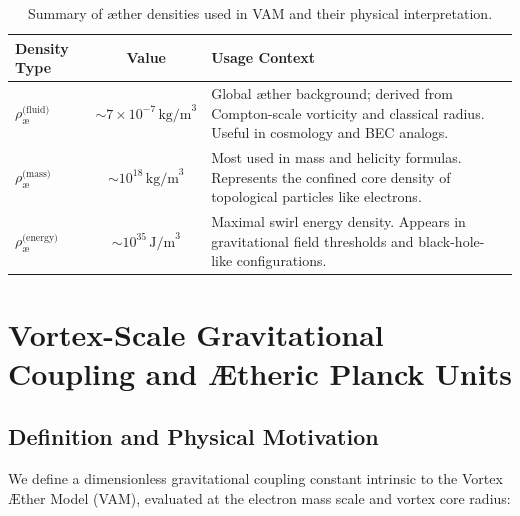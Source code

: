 \documentclass[preprint]{revtex4-2}
\begin{document}
                \vspace{0.3cm}
                \begin{table}[H]
                    \centering
                    \scriptsize
                    \begin{tabular}{|l|c|p{7.5cm}|}
                        \hline
                        \textbf{Density Type} & \textbf{Value} & \textbf{Usage Context} \\
                        \hline
                        \( \rho_{\text{\ae}}^{\text{(fluid)}} \) & \( \sim 7 \times 10^{-7} \, \text{kg/m}^3 \) & Global æther background; derived from Compton-scale vorticity and classical radius. Useful in cosmology and BEC analogs. \\
                        \hline
                        \( \rho_{\text{\ae}}^{\text{(mass)}} \) & \( \sim 10^{18} \, \text{kg/m}^3 \) & Most used in mass and helicity formulas. Represents the confined core density of topological particles like electrons. \\
                        \hline
                        \( \rho_{\text{\ae}}^{\text{(energy)}} \) & \( \sim 10^{35} \, \text{J/m}^3 \) & Maximal swirl energy density. Appears in gravitational field thresholds and black-hole-like configurations. \\
                        \hline
                    \end{tabular}
                    \caption{Summary of æther densities used in VAM and their physical interpretation.}
                    \label{tab:aether_density_summary}
                \end{table}

       \section{Vortex-Scale Gravitational Coupling and Ætheric Planck Units}
                \subsection*{Definition and Physical Motivation}

                We define a dimensionless gravitational coupling constant intrinsic to the Vortex \AE{}ther Model (VAM), evaluated at the electron mass scale and vortex core radius:
\end{document}
